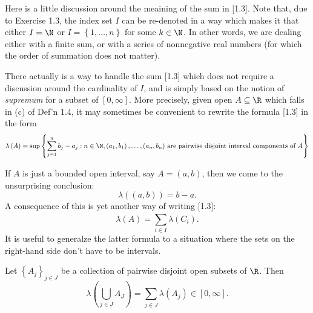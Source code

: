 \documentclass[pmath450]{subfiles}
\begin{document}
    \np Here is a little discussion around the meaining of the sum in [1.3]. Note that, due to Exercise 1.3, the index set $I$ can be re-denoted in a way which makes it that either $I=\N$ or $I=\left\lbrace 1,\ldots,n \right\rbrace$ for some $k\in\N$. In other words, we are dealing either with a finite sum, or with a series of nonnegative real numbers (for which the order of summation does not matter).

    There actually is a way to handle the sum [1.3] which does not require a discussion around the cardinality of $I$, and is simply based on the notion of \textit{supremum} for a subset of $\left[ 0,\infty \right]$. More precisely, given open $A\subseteq\R$ which falls in (c) of Def'n 1.4, it may sometimes be convenient to rewrite the formula [1.3] in the form
    \begin{equation}
        \lambda\left( A \right)=\sup\left\lbrace \sum^{n}_{j=1}b_j-a_j: n\in\N, \text{$\left( a_1,b_1 \right),\ldots,\left( a_n,b_n \right)$ are pairwise disjoint interval components of $A$} \right\rbrace
    \end{equation}

    \np If $A$ is just a bounded open interval, say $A=\left( a,b \right)$, then we come to the unsurprising conclusion:
    \begin{equation*}
        \lambda\left( \left( a,b \right) \right)=b-a.
    \end{equation*}
    A consequence of this is yet another way of writing [1.3]:
    \begin{equation}
        \lambda\left( A \right) = \sum^{}_{i\in I}\lambda\left( C_i \right).
    \end{equation}
    It is useful to generalze the latter formula to a situation where the sets on the right-hand side don't have to be intervals.

    \begin{prop}{}
        Let $\left\lbrace A_j \right\rbrace^{}_{j\in J}$ be a collection of pairwise disjoint open subsets of $\R$. Then
        \begin{equation}
            \lambda\left( \bigcup^{}_{j\in J}A_J \right) = \sum^{}_{j\in J}\lambda\left( A_j \right)\in\left[ 0,\infty \right].
        \end{equation}
    \end{prop}
    
    \placeqed[Tl;dr]
\end{document}
